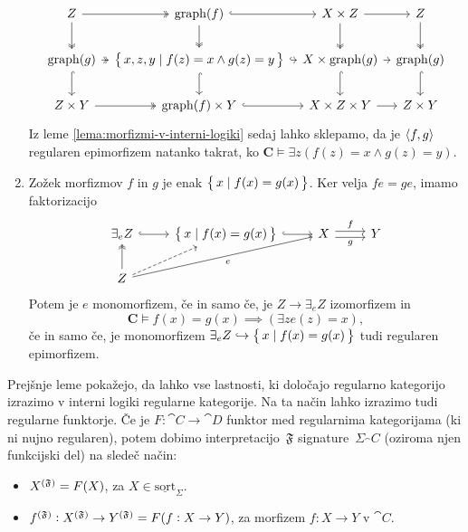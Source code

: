 \documentclass[../kategoricna_logika.tex]{subfiles}
\begin{document}
\begin{dokaz}
\begin{enumerate}[label=(\roman*)]
\begin{equation*}
\begin{tikzcd}[column sep=tiny]
          Z \ar[d, two heads] \ar[r, two heads] & \mathrm{graph}(f)
          \ar[d, two heads] \ar[r, hook] &
          X \times Z \ar[d, two heads] \ar[r] & Z \ar[d, two heads] \\
          \mathrm{graph}(g) \ar[d, hook] \ar[r, two heads] &
          \set{x,z,y \mid f(z) = x \land g(z) = y} \ar[d, hook] \ar[r,
          hook] & X \times \mathrm{graph}(g) \ar[d, hook] \ar[r] &
          \mathrm{graph}(g) \ar[d, hook] \\
          Z \times Y \ar[r, two heads] & \mathrm{graph}(f) \times Y
          \ar[r, hook] & X \times Z \times Y \ar[r] & Z \times Y
        \end{tikzcd}
      \end{equation*}
      Iz leme \ref{lema:morfizmi-v-interni-logiki} sedaj lahko
      sklepamo, da je $\fprod{f,g}$ regularen epimorfizem natanko
      takrat, ko
      $\mathbf{C} \models \exists z (f(z) = x \land g(z) = y)$.
      
    \item Zožek morfizmov $f$ in $g$ je enak
      $\set{x \mid f(x) = g(x)}$.  Ker velja ${f e = g e}$,
      imamo faktorizacijo
      \begin{equation*}
        \begin{tikzcd}
          \exists_{e}Z \ar[r, hook] & \set{x \mid f(x) = g(x)} \ar[r,
          hook] &
          X \ar[r, shift left, "f"] \ar[r, shift right, "g"'] & Y \\
          Z \ar[u, two heads] \ar[ur, dashed] \ar[urr, "e"']
        \end{tikzcd}
      \end{equation*}
      Potem je $e$ monomorfizem, če in samo če, je
      $Z \to \exists_{e}Z$ izomorfizem in
      \[\mathbf{C} \models f(x) = g(x) \implies (\exists z e(z) = x),\]
      če in samo če, je monomorfizem
      $\exists_{e}Z \hookrightarrow \set{x \mid f(x) = g(x)}$ tudi
      regularen epimorfizem.
    \end{enumerate}
  \end{dokaz}%
  Prejšnje leme pokažejo, da lahko vse lastnosti, ki določajo
  regularno kategorijo izrazimo v interni logiki regularne kategorije.
  Na ta način lahko izrazimo tudi regularne funktorje.  Če je
  $F : \cat{C} \to \cat{D}$ funktor med regularnima kategorijama (ki
  ni nujno regularen), potem dobimo interpretacijo~$\mathfrak{F}$
  signature~$\Sigma_\cat{C}$ (oziroma njen funkcijski del) na sledeč
  način:
  \begin{itemize}
  \item $\interp[\mathfrak{F}]{X} = F(X)$, za
    $X \in \underline{\mathrm{sort}}_{\Sigma}$.
  \item
    $\interp[\mathfrak{F}]{f} : \interp[\mathfrak{F}]{X} \to
    \interp[\mathfrak{F}]{Y} = F(f : X \to Y)$, za morfizem
    $f: X \to Y$ v $\cat{C}$.
  \end{itemize}
\end{document}
